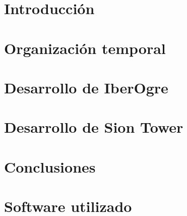 \documentclass[a4paper,11pt]{book}
\begin{document}
\renewcommand{\figurename}{Figura}
\renewcommand{\listfigurename}{Indice de figuras}
\renewcommand{\tablename}{Tabla}
\renewcommand{\listtablename}{Indice de tablas}

\pagestyle{empty}

\cleardoublepage


\cleardoublepage
\pagestyle{plain}

\frontmatter %


\cleardoublepage

\tableofcontents
\listoffigures
\listoftables

\mainmatter %

\chapter{Introducción}
\label{chap:introduccion}


\chapter{Organización temporal}
\label{chap:calendario}


\chapter{Desarrollo de IberOgre}
\label{chap:desarrollo-iberogre}


\chapter{Desarrollo de Sion Tower}
\label{chap:desarrollo-siontower}


\chapter{Conclusiones}
\label{chap:conclusiones}




\backmatter %

\chapter*{Software utilizado}
\label{chap:software}

\end{document}
